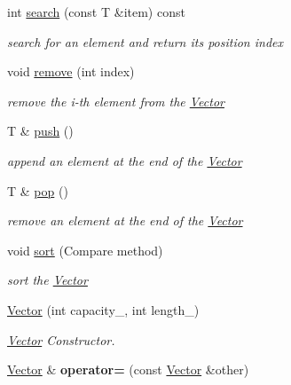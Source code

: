 \begin{DoxyCompactItemize}
\item 
int \hyperlink{class_i_dream_sky_1_1_vector_a070bf8c6fede9ef23308a989d2f119be}{search} (const T \&item) const 
\begin{DoxyCompactList}\small\item\em search for an element and return its position index \end{DoxyCompactList}\item 
void \hyperlink{class_i_dream_sky_1_1_vector_aeceea0510aa63871e34986bf20fbfe0a}{remove} (int index)
\begin{DoxyCompactList}\small\item\em remove the i-\/th element from the \hyperlink{class_i_dream_sky_1_1_vector}{Vector} \end{DoxyCompactList}\item 
T \& \hyperlink{class_i_dream_sky_1_1_vector_afc6fb1459f439462705a4da35903ff46}{push} ()
\begin{DoxyCompactList}\small\item\em append an element at the end of the \hyperlink{class_i_dream_sky_1_1_vector}{Vector} \end{DoxyCompactList}\item 
T \& \hyperlink{class_i_dream_sky_1_1_vector_a4ab4981cd45eb47bd055ab5b8b08dd4c}{pop} ()
\begin{DoxyCompactList}\small\item\em remove an element at the end of the \hyperlink{class_i_dream_sky_1_1_vector}{Vector} \end{DoxyCompactList}\item 
void \hyperlink{class_i_dream_sky_1_1_vector_a23f69fbe1049987fdea11fcc29a342b5}{sort} (Compare method)
\begin{DoxyCompactList}\small\item\em sort the \hyperlink{class_i_dream_sky_1_1_vector}{Vector} \end{DoxyCompactList}\item 
\hyperlink{class_i_dream_sky_1_1_vector_a6040d207a97d2dd7109972af45a6da7c}{Vector} (int capacity\+\_, int length\+\_)
\begin{DoxyCompactList}\small\item\em \hyperlink{class_i_dream_sky_1_1_vector}{Vector} Constructor. \end{DoxyCompactList}\item 
\hyperlink{class_i_dream_sky_1_1_vector}{Vector} \& {\bfseries operator=} (const \hyperlink{class_i_dream_sky_1_1_vector}{Vector} \&other)\hypertarget{class_i_dream_sky_1_1_vector_a94aa19b15daafc6c0d2cf7e4c59d9ab4}{}\label{class_i_dream_sky_1_1_vector_a94aa19b15daafc6c0d2cf7e4c59d9ab4}


\end{DoxyCompactItemize}
